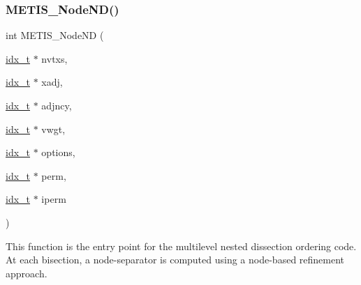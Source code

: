 \subsubsection{\texorpdfstring{M\+E\+T\+I\+S\+\_\+\+Node\+N\+D()}{METIS\_NodeND()}}
{\footnotesize\ttfamily int M\+E\+T\+I\+S\+\_\+\+Node\+ND (\begin{DoxyParamCaption}\item[{\hyperlink{a00876_aaa5262be3e700770163401acb0150f52}{idx\+\_\+t} $\ast$}]{nvtxs,  }\item[{\hyperlink{a00876_aaa5262be3e700770163401acb0150f52}{idx\+\_\+t} $\ast$}]{xadj,  }\item[{\hyperlink{a00876_aaa5262be3e700770163401acb0150f52}{idx\+\_\+t} $\ast$}]{adjncy,  }\item[{\hyperlink{a00876_aaa5262be3e700770163401acb0150f52}{idx\+\_\+t} $\ast$}]{vwgt,  }\item[{\hyperlink{a00876_aaa5262be3e700770163401acb0150f52}{idx\+\_\+t} $\ast$}]{options,  }\item[{\hyperlink{a00876_aaa5262be3e700770163401acb0150f52}{idx\+\_\+t} $\ast$}]{perm,  }\item[{\hyperlink{a00876_aaa5262be3e700770163401acb0150f52}{idx\+\_\+t} $\ast$}]{iperm }\end{DoxyParamCaption})}

This function is the entry point for the multilevel nested dissection ordering code. At each bisection, a node-\/separator is computed using a node-\/based refinement approach.


